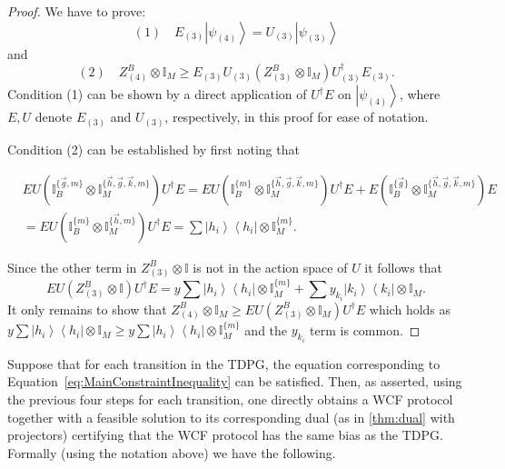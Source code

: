 \documentclass{theoretics}
\newcommand{\atul}[1]{#1} %
\begin{document}
\begin{enumerate}
        \begin{proof}
          We have to prove: $$ (1)\quad E_{(3)}\left|\psi_{(4)}\right\rangle =U_{(3)}\left|\psi_{(3)}\right\rangle $$
          and
          $$
          (2)\quad
            Z_{(4)}^{B}\otimes\mathbb{I}_{M}\ge E_{(3)}U_{(3)}\left(Z_{(3)}^{B}\otimes\mathbb{I}_{M}\right)U^\dagger_{(3)}E_{(3)}.
          $$ %
          Condition (1) can be shown by a direct application of $U^{\dagger}E$
          on $\left|\psi_{(4)}\right\rangle $, where $E,U$ denote
          $E_{(3)}$ and $U_{(3)}$, respectively, in this proof for ease of notation.

          Condition (2) can be established by first noting that \begin{footnotesize}
            \begin{align*}
               & EU\left(\mathbb{I}_{B}^{\{\vec{g},m\}}\otimes\mathbb{I}_{M}^{\{\vec{h},\vec{g},\vec{k},m\}}\right)U^{\dagger}E  =EU\left(\mathbb{I}_{B}^{\{m\}}\otimes\mathbb{I}_{M}^{\{\vec{h},\vec{g},\vec{k},m\}}\right)U^{\dagger}E+E\left(\mathbb{I}_{B}^{\{\vec{g}\}}\otimes\mathbb{I}_{M}^{\{\vec{h},\vec{g},\vec{k},m\}}\right)E \\
               & =EU\left(\mathbb{I}_{B}^{\{m\}}\otimes\mathbb{I}_{M}^{\{\vec{h},m\}}\right)U^{\dagger}E=\sum\left|h_{i}\right\rangle \left\langle h_{i}\right|\otimes\mathbb{I}_{M}^{\{m\}}.
            \end{align*}
          \end{footnotesize}
          Since the other term in $Z_{(3)}^{B}\otimes\mathbb{I}$ is not in the action space of $U$ it follows that
          \begin{displaymath}
            EU(Z_{(3)}^{B}\otimes\mathbb{I})U^{\dagger}E=y\sum\left|h_{i}\right\rangle \left\langle h_{i}\right|\otimes\mathbb{I}_{M}^{\{m\}}+\sum y_{k_{i}}\left|k_{i}\right\rangle \left\langle k_{i}\right|\otimes\mathbb{I}_{M}.
          \end{displaymath}
          It only remains to show that $Z_{(4)}^{B}\otimes\mathbb{I}_{M}\ge EU\left(Z_{(3)}^{B}\otimes\mathbb{I}_{M}\right)U^\dagger E$
          which holds as $y\sum\left|h_{i}\right\rangle \left\langle h_{i}\right|\otimes\mathbb{I}_{M}\ge y\sum\left|h_{i}\right\rangle \left\langle h_{i}\right|\otimes\mathbb{I}_{M}^{\{m\}}$
          and the $y_{k_{i}}$ term is common.
        \end{proof}
\end{enumerate}


Suppose that for each transition in the TDPG, the equation corresponding to Equation~\eqref{eq:MainConstraintInequality} can be satisfied. Then, as asserted, using the previous four steps for each transition, one directly obtains a \atul{
  WCF protocol together with a feasible solution to its corresponding dual (as in \cref{thm:dual} with projectors) certifying that the WCF protocol has the same bias as the TDPG. Formally (using the notation above) we have the following.}
%
\end{document}
